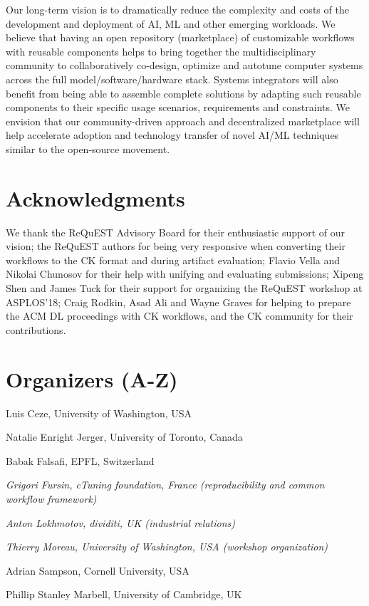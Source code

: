 \documentclass[10pt,onecolumn]{article}
\newenvironment{packed_itemize}{
\begin{itemize}
  \setlength{\itemsep}{1pt}
  \setlength{\parskip}{0pt}
  \setlength{\parsep}{0pt}
}{\end{itemize}}
\begin{document}
Our long-term vision is to dramatically reduce the complexity
and costs of the development and deployment of AI, ML and
other emerging workloads. We believe that having an open
repository (marketplace) of customizable workflows with
reusable components helps to bring together the
multidisciplinary community to collaboratively co-design,
optimize and autotune computer systems across the full
model/software/hardware stack. Systems integrators will also
benefit from being able to assemble complete solutions
by adapting such reusable components to their specific usage
scenarios, requirements and constraints. We envision that our
community-driven approach and decentralized marketplace will
help accelerate adoption and technology transfer of novel
AI/ML techniques similar to the open-source movement.

\section*{Acknowledgments}

We thank the ReQuEST Advisory Board for their enthusiastic
support of our vision; the ReQuEST authors for being very
responsive when converting their workflows to the CK format
and during artifact evaluation; Flavio Vella and Nikolai
Chunosov for their help with unifying and evaluating
submissions; Xipeng Shen and James Tuck for their support for
organizing the ReQuEST workshop at ASPLOS'18; Craig Rodkin,
Asad Ali and Wayne Graves for helping to prepare the ACM DL
proceedings with CK workflows, and the CK community for their
contributions.


\section*{Organizers (A-Z)}

\begin{packed_itemize}

 \item Luis Ceze, University of Washington, USA
 \item Natalie Enright Jerger, University of Toronto, Canada
 \item Babak Falsafi, EPFL, Switzerland
 \item \textit{Grigori Fursin, cTuning foundation, France (reproducibility and common workflow framework)}
 \item \textit{Anton Lokhmotov, dividiti, UK (industrial relations)}
 \item \textit{Thierry Moreau, University of Washington, USA (workshop organization)}
 \item Adrian Sampson, Cornell University, USA
 \item Phillip Stanley Marbell, University of Cambridge, UK 

\end{packed_itemize}
\end{document}
